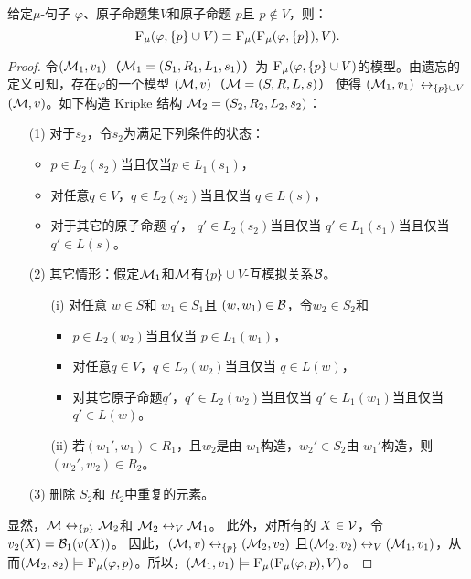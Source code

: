 \begin{proposition}[分解性]\label{chapter06:disTF}  给定$\mu$-句子 $\varphi$、原子命题集$V$和原子命题 $p$且 $p \notin V$，则：
	\[
	{\textsc{F}_{\textsc{$\mu$}}}(\varphi, \{p\} \cup V) \equiv {\textsc{F}_{\textsc{$\mu$}}}({\textsc{F}_{\textsc{$\mu$}}}(\varphi, \{p\}), V).
	\]
\end{proposition}
\begin{proof}
	令$({\cal M}_1,v_1)$（${\cal M}_1=(S_1, R_1, L_1, s_1)$）为 ${\textsc{F}_{\textsc{$\mu$}}}(\varphi, \{p\} \cup V)$的模型。由遗忘的定义可知，存在$\varphi$的一个模型 $({\cal M},v)$（${\cal M} = (S, R,L, s)$） 使得 $({\cal M}_1,v_1)$ $\leftrightarrow_{\{p\} \cup V}$ $({\cal M},v)$。如下构造 Kripke 结构 ${\cal M}_2 = (S_2, R_2, L_2, s_2)$：
	\begin{itemize}
		\item[(1)] 对于$s_2$，令$s_2$为满足下列条件的状态：
		\begin{itemize}
			\item $p \in L_2(s_2)$当且仅当$p \in L_1(s_1)$，
			\item 对任意$q \in V$，$q \in L_2(s_2)$当且仅当 $q\in L(s)$，
			\item 对于其它的原子命题 $q'$， $q' \in L_2(s_2)$当且仅当 $q' \in L_1(s_1)$当且仅当 $q'\in L(s)$。
		\end{itemize}
		\item[(2)] 其它情形：假定${\cal M}_1$和${\cal M}$有$\{p\} \cup V$-互模拟关系${\cal B}$。
		\begin{itemize}
			\item[(i)] 对任意 $w \in S$和 $w_1 \in S_1$且 $(w,w_1)\in {\cal B}$，令$w_2 \in S_2$和
			\begin{itemize}
				\item $p \in L_2(w_2)$当且仅当 $p \in L_1(w_1)$，
				\item 对任意$q \in V$，$q \in L_2(w_2)$当且仅当 $q\in L(w)$，
				\item 对其它原子命题$q'$，$q' \in L_2(w_2)$当且仅当 $q' \in L_1(w_1)$当且仅当 $q'\in L(w)$。
			\end{itemize}
			\item[(ii)] 若$(w_1', w_1)\in R_1$，且$w_2$是由 $w_1$构造，$w_2'\in S_2$由 $w_1'$构造，则$(w_2', w_2)\in R_2$。
		\end{itemize}
		\item[(3)] 删除 $S_2$和 $R_2$中重复的元素。
	\end{itemize}
	显然，${\cal M} \leftrightarrow_{\{p\}} {\cal M}_2$和 ${\cal M}_2 \leftrightarrow_V {\cal M}_1$。
	此外，对所有的 $X \in {\cal V}$，令$v_2(X) = {\cal B}_1(v(X))$。
	因此，$({\cal M},v) \leftrightarrow_{\{p\}} ({\cal M}_2,v_2)$ 且$({\cal M}_2,v_2) \leftrightarrow_V ({\cal M}_1,v_1)$，从而$({\cal M}_2, s_2) \models {\textsc{F}_{\textsc{$\mu$}}}(\varphi, p)$。所以，$({\cal M}_1, v_1) \models {\textsc{F}_{\textsc{$\mu$}}}({\textsc{F}_{\textsc{$\mu$}}}(\varphi, p), V)$。
	

\end{proof}
